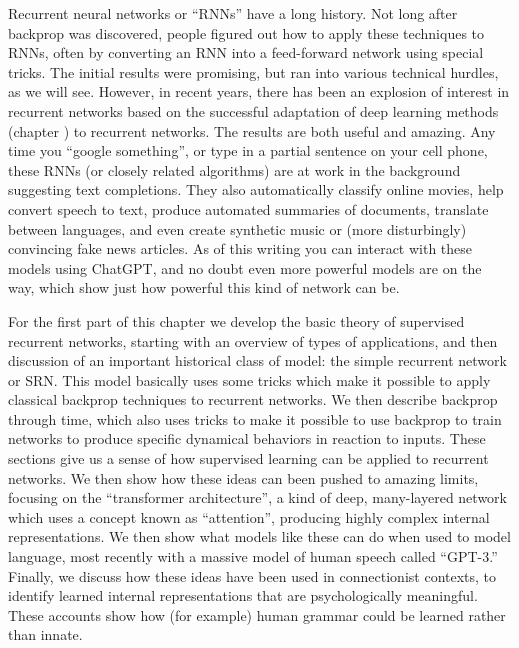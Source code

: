 Recurrent neural networks or ``RNNs'' have a long history. Not long after backprop was discovered, people figured out how to apply these techniques to RNNs, often by converting an RNN into a feed-forward network using special tricks. The initial results were promising, but ran into various technical hurdles, as we will see. However, in recent years, there has been an explosion of interest in recurrent networks based on the successful adaptation of deep learning methods (chapter ) to recurrent networks. The results are both useful and amazing. Any time you ``google something'', or type in a partial sentence on your cell phone, these RNNs (or closely related algorithms) are at work in the background suggesting text completions. They also automatically classify online movies, help convert speech to text, produce automated summaries of documents, translate between languages, and even create synthetic music or (more disturbingly) convincing fake news articles.  As of this writing you can interact with these models using ChatGPT, and no doubt even more powerful models are on the way, which show just how powerful this kind of network can be.

For the first part of this chapter we develop the basic theory of supervised recurrent networks, starting with an overview of types of applications, and then discussion of an important historical class of model: the simple recurrent network or SRN. This model basically uses some tricks which make it possible to apply classical backprop techniques to recurrent networks. We then describe backprop through time, which also uses tricks to make it possible to use backprop to train networks to produce specific dynamical behaviors in reaction to inputs. These sections give us a sense of how supervised learning can be applied to recurrent networks. We then show how these ideas can been pushed to amazing limits, focusing on the ``transformer architecture'', a kind of deep, many-layered network which uses a concept known as ``attention'', producing highly complex internal representations. We then show what models like these can do when used to model language, most recently with a massive model of human speech called ``GPT-3.'' Finally, we discuss how these ideas have been used in connectionist contexts, to identify learned internal representations that are psychologically meaningful. These accounts show how (for example) human grammar could be learned rather than innate.

